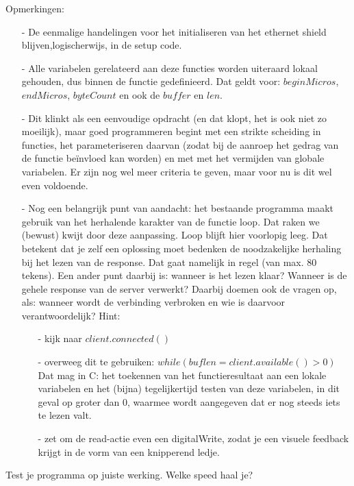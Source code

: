 Opmerkingen:
\begin{enumerate}
  \item[-] De eenmalige handelingen voor het initialiseren van het ethernet shield blijven,logischerwijs, in de setup code.
  \item[-] Alle variabelen gerelateerd aan deze functies worden uiteraard lokaal gehouden, dus binnen de functie gedefinieerd. Dat geldt voor: $beginMicros$, $endMicros$, $byteCount$ en ook de $buffer$ en $len$.
  \item[-] Dit klinkt als een eenvoudige opdracht (en dat klopt, het is ook niet zo moeilijk), maar goed programmeren begint met een strikte scheiding in functies, het parameteriseren daarvan (zodat bij de aanroep het gedrag van de functie beïnvloed kan worden) en met met het vermijden van globale variabelen. Er zijn nog wel meer criteria te geven, maar voor nu is dit wel even voldoende.
  \item[-] Nog een belangrijk punt van aandacht: het bestaande programma maakt gebruik van het herhalende karakter van de functie loop. Dat raken we (bewust) kwijt door deze aanpassing. Loop blijft hier voorlopig leeg. Dat betekent dat je zelf een oplossing moet bedenken de noodzakelijke herhaling bij het lezen van de response. Dat gaat namelijk in regel (van max. 80 tekens). \newline
Een ander punt daarbij is: wanneer is het lezen klaar? Wanneer is de gehele response van de server verwerkt? Daarbij doemen ook de vragen op, als: wanneer wordt de verbinding verbroken en wie is daarvoor verantwoordelijk? Hint:
  \begin{enumerate}
    \item[-] kijk naar $client.connected()$
    \item[-] overweeg dit te gebruiken: $while (buflen = client.available() > 0)$ Dat mag in C: het toekennen van het functieresultaat aan een lokale variabelen en het (bijna) tegelijkertijd testen van deze variabelen, in dit geval op groter dan 0, waarmee wordt aangegeven dat er nog steeds iets te lezen valt.
    \item[-] zet om de read-actie even een digitalWrite, zodat je een visuele feedback krijgt in de vorm van een knipperend ledje.
  \end{enumerate}
\end{enumerate}
\begin{exercise}
Test je programma op juiste werking. Welke speed haal je?
\end{exercise}

